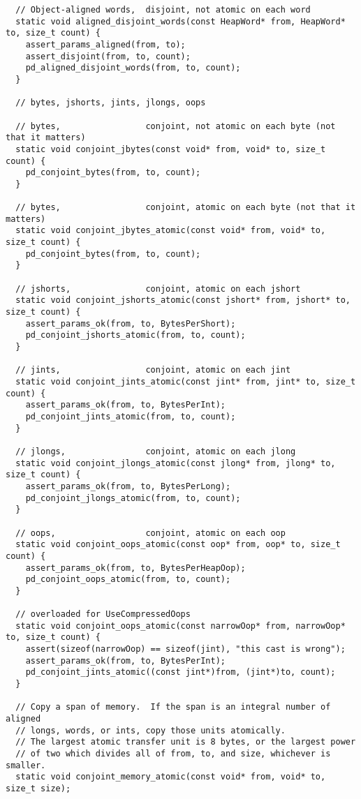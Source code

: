 \begin{itemize}
\begin{verbatim}
  // Object-aligned words,  disjoint, not atomic on each word
  static void aligned_disjoint_words(const HeapWord* from, HeapWord* to, size_t count) {
    assert_params_aligned(from, to);
    assert_disjoint(from, to, count);
    pd_aligned_disjoint_words(from, to, count);
  }

  // bytes, jshorts, jints, jlongs, oops

  // bytes,                 conjoint, not atomic on each byte (not that it matters)
  static void conjoint_jbytes(const void* from, void* to, size_t count) {
    pd_conjoint_bytes(from, to, count);
  }

  // bytes,                 conjoint, atomic on each byte (not that it matters)
  static void conjoint_jbytes_atomic(const void* from, void* to, size_t count) {
    pd_conjoint_bytes(from, to, count);
  }

  // jshorts,               conjoint, atomic on each jshort
  static void conjoint_jshorts_atomic(const jshort* from, jshort* to, size_t count) {
    assert_params_ok(from, to, BytesPerShort);
    pd_conjoint_jshorts_atomic(from, to, count);
  }

  // jints,                 conjoint, atomic on each jint
  static void conjoint_jints_atomic(const jint* from, jint* to, size_t count) {
    assert_params_ok(from, to, BytesPerInt);
    pd_conjoint_jints_atomic(from, to, count);
  }

  // jlongs,                conjoint, atomic on each jlong
  static void conjoint_jlongs_atomic(const jlong* from, jlong* to, size_t count) {
    assert_params_ok(from, to, BytesPerLong);
    pd_conjoint_jlongs_atomic(from, to, count);
  }

  // oops,                  conjoint, atomic on each oop
  static void conjoint_oops_atomic(const oop* from, oop* to, size_t count) {
    assert_params_ok(from, to, BytesPerHeapOop);
    pd_conjoint_oops_atomic(from, to, count);
  }

  // overloaded for UseCompressedOops
  static void conjoint_oops_atomic(const narrowOop* from, narrowOop* to, size_t count) {
    assert(sizeof(narrowOop) == sizeof(jint), "this cast is wrong");
    assert_params_ok(from, to, BytesPerInt);
    pd_conjoint_jints_atomic((const jint*)from, (jint*)to, count);
  }

  // Copy a span of memory.  If the span is an integral number of aligned
  // longs, words, or ints, copy those units atomically.
  // The largest atomic transfer unit is 8 bytes, or the largest power
  // of two which divides all of from, to, and size, whichever is smaller.
  static void conjoint_memory_atomic(const void* from, void* to, size_t size);


\end{verbatim}
\end{itemize}
